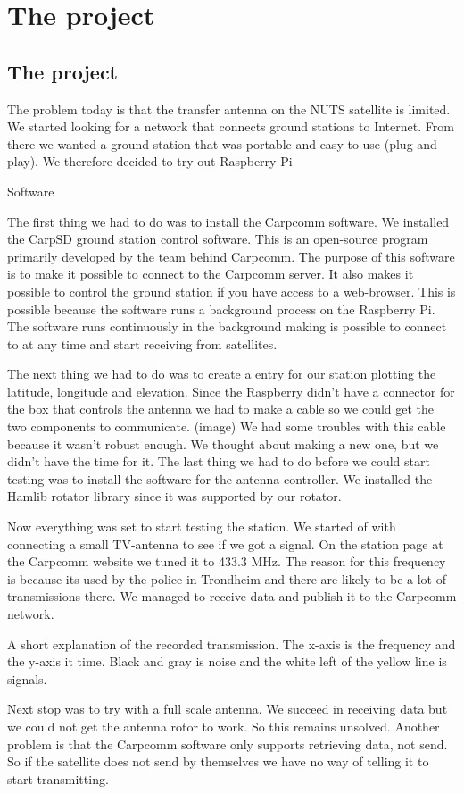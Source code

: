 \chapter{The project}
\label{chap:the_project}


\section {The project}

The problem today is that the transfer antenna on the NUTS satellite is limited. We started looking for a network that connects ground stations to Internet. From there we wanted a ground station that was portable and easy to use (plug and play). We therefore decided to try out Raspberry Pi 

Software

The first thing we had to do was to install the Carpcomm software. We installed the CarpSD ground station control software. This is an open-source program primarily developed by the team behind Carpcomm. The purpose of this software is to make it possible to connect to the Carpcomm server. It also makes it possible to control the ground station if you have access to a web-browser. This is possible because the software runs a background process on the Raspberry Pi. The software runs continuously in the background making is possible to connect to at any time and start receiving from satellites. 

The next thing we had to do was to create a entry for our station plotting the latitude, longitude and elevation.    
Since the Raspberry didn’t have a connector for the box that controls the antenna we had to make a cable so we could get the two components to communicate. (image) 
We had some troubles with this cable because it wasn't robust enough. We thought about making a new one, but we didn't have the time for it. 
The last thing we had to do before we could start testing was to install the software for the antenna controller. We installed the Hamlib rotator library since it was supported by our rotator. 

Now everything was set to start testing the station. We started of with connecting a small TV-antenna to see if we got a signal. On the station page at the Carpcomm website we tuned it to 433.3 MHz. The reason for this  frequency is because its used by the police in Trondheim and there are likely to be a lot of transmissions there.  We managed to receive data and publish it to the Carpcomm network.


A short explanation of the recorded transmission. The x-axis is the frequency and the y-axis it time. Black and gray is noise and the white left of the yellow line is signals.  

 Next stop was to try with a full scale antenna. We succeed in receiving data but we could not get the antenna rotor to work. So this remains unsolved. Another problem is that the Carpcomm software only supports retrieving data, not send. So if the satellite does not send by themselves we have no way of telling it to start transmitting. 




